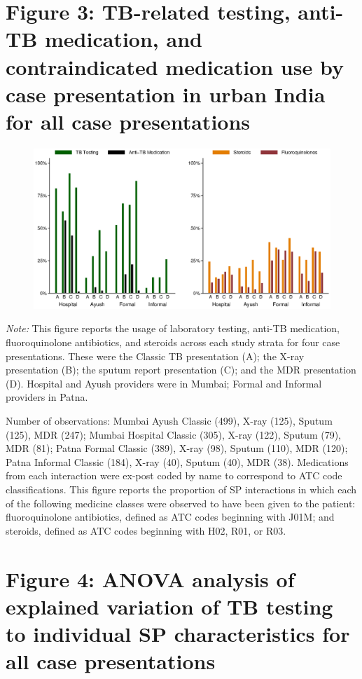 \documentclass[fleqn,10pt]{wlscirep}
\begin{document}
\section*{Figure 3: TB-related testing, anti-TB medication, and contraindicated medication use by case presentation in urban India for all case presentations}

\begin{figure}[h]
\centering
\includegraphics[width=1\textwidth]{f4.eps}
\end{figure}

\noindent\textit{Note:} This figure reports the usage of laboratory testing, anti-TB medication, fluoroquinolone antibiotics, and steroids across each study strata for four case presentations. These were the Classic TB presentation (A); the X-ray presentation (B); the sputum report presentation (C); and the MDR presentation (D). Hospital and Ayush providers were in Mumbai; Formal and Informal providers in Patna.

Number of observations: Mumbai Ayush Classic (499), X-ray (125), Sputum (125), MDR (247); Mumbai Hospital Classic (305), X-ray (122), Sputum (79), MDR (81); Patna Formal Classic (389), X-ray (98), Sputum (110), MDR (120); Patna Informal Classic (184), X-ray (40), Sputum (40), MDR (38). Medications from each interaction were ex-post coded by name to correspond to ATC code classifications. This figure reports the proportion of SP interactions in which each of the following medicine classes were observed to have been given to the patient: fluoroquinolone antibiotics, defined as ATC codes beginning with J01M; and steroids, defined as ATC codes beginning with H02, R01, or R03.

\newpage

\section*{Figure 4: ANOVA analysis of explained variation of TB testing to individual SP characteristics for all case presentations}
\end{document}

